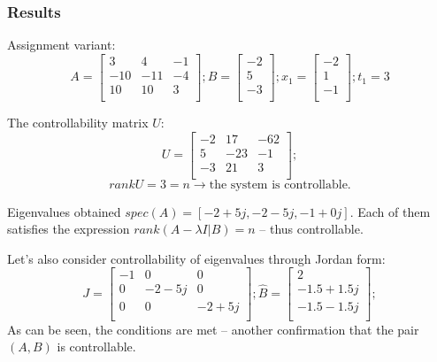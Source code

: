 \subsubsection{Results}
Assignment variant:
\[ A = \begin{bmatrix}
        3 & 4 & -1 \\
        -10 & -11 & -4 \\
        10 & 10 & 3 \\
        \end{bmatrix}; 
        B = \begin{bmatrix}
                -2 \\
                5 \\
                -3 \\
                \end{bmatrix}; 
        x_1 = \begin{bmatrix}
                -2 \\
                1 \\
                -1 \\
                \end{bmatrix}; 
        t_1 = 3
\]

The controllability matrix \(U\):
\[ U = \begin{bmatrix}
        -2 & 17 & -62 \\
        5 & -23 & -1 \\
        -3 & 21 & 3 \\
        \end{bmatrix};
\]
\[rankU = 3 = n \rightarrow \text{the system is controllable.}\]

Eigenvalues obtained \(spec(A) = [-2+5j, -2 -5j, -1+0j]\). Each of them satisfies the expression \(rank(A - \lambda I | B) = n \) -- thus controllable.

Let's also consider controllability of eigenvalues through Jordan form:
\[
        J = \begin{bmatrix}
                -1 & 0 & 0 \\
                0 & -2 - 5j & 0 \\
                0 & 0 & -2 + 5j \\
                \end{bmatrix};
        \hat{B} = \begin{bmatrix}
                2 \\
                -1.5 + 1.5j \\
                -1.5 - 1.5j \\
                \end{bmatrix};
\]
As can be seen, the conditions are met -- another confirmation that the pair \((A, B)\) is controllable.

